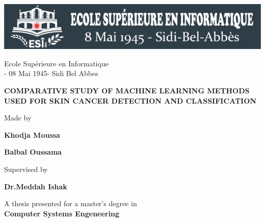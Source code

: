 	\begin{titlepage}
		\begin{center}	
			\Large
			
			\includegraphics[]{./cover-page/esi-logo.png}
			
			Ecole Supérieure en Informatique\\
			- 08 Mai 1945- Sidi Bel Abbes
			
			\hrulefill
			
			\vspace{0.5cm}
			\textbf{COMPARATIVE STUDY OF MACHINE LEARNING METHODS USED FOR SKIN CANCER DETECTION AND CLASSIFICATION}
			
			\LARGE
			
			\vspace{1.5cm}
			Made by
			\vspace{0.5cm}
			
			\textbf{Khodja Moussa}
			
			\textbf{Balbal Oussama}
			
			\vspace{1.5cm}
			Supervised by
			\vspace{0.5cm}
			
			\textbf{Dr.Meddah Ishak}			
			
			\vfill
			A thesis presented for a master's degree in\\
			\textbf{Computer Systems Engeneering}
			\vspace{0.8cm}
		\end{center}
	\end{titlepage}
